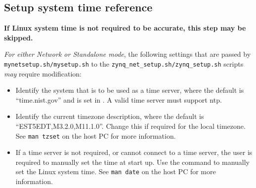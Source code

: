 \iffalse
This file is protected by Copyright. Please refer to the COPYRIGHT file
distributed with this source distribution.

This file is part of OpenCPI <http://www.opencpi.org>

OpenCPI is free software: you can redistribute it and/or modify it under the
terms of the GNU Lesser General Public License as published by the Free Software
Foundation, either version 3 of the License, or (at your option) any later
version.

OpenCPI is distributed in the hope that it will be useful, but WITHOUT ANY
WARRANTY; without even the implied warranty of MERCHANTABILITY or FITNESS FOR A
PARTICULAR PURPOSE. See the GNU Lesser General Public License for more details.

You should have received a copy of the GNU Lesser General Public License along
with this program. If not, see <http://www.gnu.org/licenses/>.
\fi

\newlength{\savedparindentsystime}%
\setlength{\savedparindentsystime}{\parindent}%
\setlength{\parindent}{0pt} %
\providecommand{\forceindent}{\leavevmode{\parindent=1em\indent}}%
\subsection{Setup system time reference}
\label{sec:Setup system time reference}
\textbf{If Linux system time is not required to be accurate, this step may be skipped.} \\ \medskip

\textit{For either Network or Standalone mode}, the following settings that are passed by \texttt{mynetsetup.sh/mysetup.sh} to the \texttt{zynq\_net\_setup.sh/zynq\_setup.sh} scripts \textit{may} require modification:

\begin{itemize}
 \item Identify the system that is to be used as a time server, where the default is ``time.nist.gov'' and is set in . A valid time server must support ntp.
 \item Identify the current timezone description, where the default is ``EST5EDT,M3.2.0,M11.1.0''. Change this if required for the local timezone. See \texttt{man tzset} on the host PC for more information.
 \item If a time server is not required, or cannot connect to a time server, the user is required to manually set the time at start up.  Use the  command to manually set the Linux system time. See \texttt{man date} on the host PC for more information.
\end{itemize}
\setlength{\parindent}{\savedparindentsystime}%
